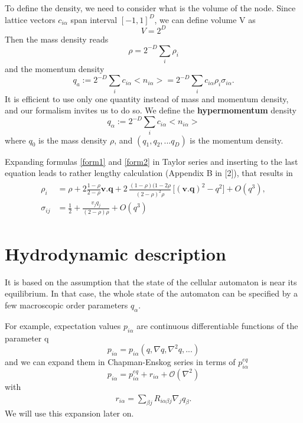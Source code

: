 To define the density, we need to consider what is the volume of the node. Since lattice vectors $c_{i\alpha}$ span interval $[-1,1]^D$, we can define volume V as
\begin{equation}
V = 2^D
\end{equation}
Then the mass density reads
\begin{equation}
\rho = 2^{-D} \sum_i \rho_i
\end{equation}
and the momentum density
\begin{equation}
q_a := 2^{-D} \sum_i c_{i\alpha} <n_{i\alpha}> = 2^{-D} \sum_i c_{i\alpha} \rho_i \sigma_{i\alpha}.
\end{equation}
It is efficient to use only one quantity instead of mass and momentum density, and our formalism invites us to do so. We define the \textbf{hypermomentum} density
\begin{equation} \label{hypermom}
q_{\alpha} := 2^{-D} \sum_i c_{i\alpha} <n_{i\alpha}>
\end{equation}
where $q_0$ is the mass density $\rho$, and $(q_1,q_2,...q_D)$ is the momentum density.

Expanding formulas \ref{form1} and \ref{form2} in Taylor series and inserting to the last equation leads to rather lengthy calculation (Appendix B in [2]), that results in 
\begin{align}
\begin{split}
\rho_i &= \rho + 2 \frac{1-\rho}{2-\rho} \bm{v}.\bm{q} + 2 \, \frac{(1-\rho)(1-2\rho}{(2-\rho)^2 \rho} \, \big[(\bm{v}.\bm{q})^2 - q^2 \big] + O(q^3), \\
\sigma_{ij} &= \frac{1}{2} + \frac{v_j q_j}{(2-\rho)\rho} + O(q^3)
\end{split}
\end{align}

\section{Hydrodynamic description}
It is based on the assumption that the state of the cellular automaton is near its equilibrium.
In that case, the whole state of the automaton can be specified by a few macroscopic order parameters $q_{\alpha}$.

\bigskip

For example, expectation values $p_{i\alpha}$ are continuous differentiable functions of the parameter q
\begin{equation}
p_{i\alpha} = p_{i\alpha}(q, \nabla q, \nabla^2 q,...)
\end{equation}
and we can expand them in Chapman-Enskog series in terms of $p_{i\alpha}^{eq}$
\begin{equation} \label{expro}
p_{i\alpha} = p_{i\alpha}^{eq} + r_{i\alpha} + \mathcal{O}(\nabla^2)
\end{equation}
with
\begin{align}
r_{i\alpha} = \sum_{\beta j} R_{i\alpha \beta j } \nabla_j q_{\beta}.
\end{align}
We will use this expansion later on.


